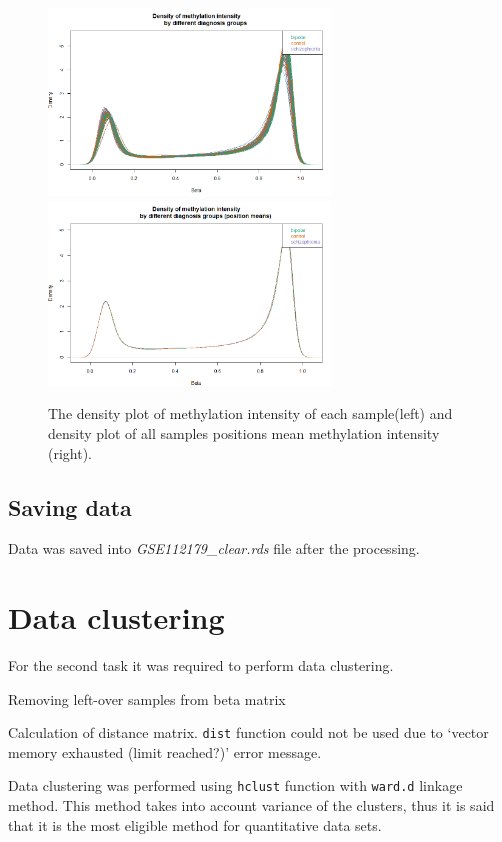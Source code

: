 \documentclass[
]{article}
\begin{document}
\begin{figure}[!h]
  \begin{center}
    \includegraphics[width=75mm]{./12.png}
    \includegraphics[width=75mm]{./13.png}
    \caption{
      The density plot of methylation intensity of each sample(left) and 
      density plot of all samples positions mean methylation intensity (right).
    }
  \end{center}
\end{figure}

\hypertarget{saving-data}{%
\subsection{Saving data}\label{saving-data}}

Data was saved into \emph{GSE112179\_clear.rds} file after the
processing.

\hypertarget{data-clustering}{%
\section{Data clustering}\label{data-clustering}}

For the second task it was required to perform data clustering.

Removing left-over samples from beta matrix

Calculation of distance matrix. \texttt{dist} function could not be used
due to `vector memory exhausted (limit reached?)' error message.

Data clustering was performed using \texttt{hclust} function with
\texttt{ward.d} linkage method. This method takes into account variance
of the clusters, thus it is said that it is the most eligible method for
quantitative data sets.
\end{document}
